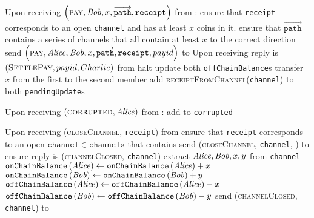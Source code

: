 \begin{functionality}{\fpaynet}
\begin{algorithmic}[1]
    \State Upon receiving $\left(\textsc{pay}, \mathit{Bob}, x,
    \overrightarrow{\mathtt{path}}, \mathtt{receipt}\right)$ from \alice:
    \Indent
      \State ensure that \texttt{receipt} corresponds to an open
      \texttt{channel} and \alice has at least $x$ coins in it.
      \State ensure that $\overrightarrow{\mathtt{path}}$ contains a series of
      channels that all contain at least $x$ to the correct direction 
      \State send $\left(\textsc{pay}, \mathit{Alice}, \mathit{Bob}, x,
      \overrightarrow{\mathtt{path}}, \mathtt{receipt}, payid\right)$ to
      \simulator
    \EndIndent
      \State Upon receiving reply is $\left(\textsc{SettlePay}, payid,
      Charlie\right)$ from \simulator
      \Indent
        \State halt 
      \Else
                \State update both \texttt{offChainBalance}s 
          \State transfer $x$ from the first to the second member 
          \State add \textsc{receiptFromChannel}(\texttt{channel})  to both
          \texttt{pendingUpdate}s
        \EndFor
      \EndIf
    \EndIndent
    \State

    \State Upon receiving $\left(\textsc{corrupted}, \mathit{Alice}\right)$ from
    \simulator:
    \Indent
      \State add \alice{} to \texttt{corrupted}
    \EndIndent
    \State

    \State Upon receiving (\textsc{closeChannel}, \texttt{receipt}) from \alice
    \Indent
      \State ensure that \texttt{receipt} corresponds to an open
      $\mathtt{channel} \in \mathtt{channels}$ that contains \alice
      \State send (\textsc{closeChannel}, \texttt{channel}, \alice) to
      \simulator
      \State ensure reply is (\textsc{channelClosed}, \texttt{channel})
      \State extract $\mathit{Alice}, \mathit{Bob}, x, y$ from \texttt{channel}
      \State $\mathtt{onChainBalance}\left(\mathit{Alice}\right) \gets
      \mathtt{onChainBalance}\left(\mathit{Alice}\right) + x$
      \State {}
      \State $\mathtt{onChainBalance}\left(\mathit{Bob}\right) \gets
      \mathtt{onChainBalance}\left(\mathit{Bob}\right) + y$
      \State $\mathtt{offChainBalance}\left(\mathit{Alice}\right) \gets
      \mathtt{offChainBalance}\left(\mathit{Alice}\right) - x$
      \State $\mathtt{offChainBalance}\left(\mathit{Bob}\right) \gets
      \mathtt{offChainBalance}\left(\mathit{Bob}\right) - y$
      \State send (\textsc{channelClosed}, \texttt{channel}) to \alice
    \EndIndent
    \State


\end{algorithmic}
\end{functionality}
